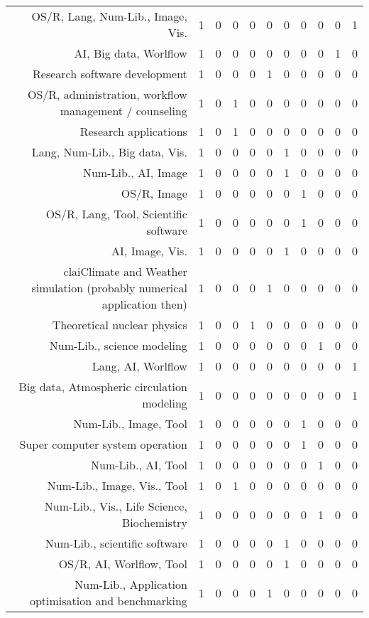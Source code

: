 {\begin{landscape}
\begin{longtable}[htb]{r|c|c|c|c|c|c|c|c|c|c}
{OS/R, Lang, Num-Lib., Image, Vis.} & 1 & 0 & 0 & 0 & 0 & 0 & 0 & 0 & 0 & 1 \\%
{AI, Big data, Worlflow} & 1 & 0 & 0 & 0 & 0 & 0 & 0 & 0 & 1 & 0 \\%
{Research software development} & 1 & 0 & 0 & 0 & 1 & 0 & 0 & 0 & 0 & 0 \\%
{OS/R, administration, workflow management / counseling} & 1 & 0 & 1 & 0 & 0 & 0 & 0 & 0 & 0 & 0 \\%
{Research applications} & 1 & 0 & 1 & 0 & 0 & 0 & 0 & 0 & 0 & 0 \\%
{Lang, Num-Lib., Big data, Vis.} & 1 & 0 & 0 & 0 & 0 & 1 & 0 & 0 & 0 & 0 \\%
{Num-Lib., AI, Image} & 1 & 0 & 0 & 0 & 0 & 1 & 0 & 0 & 0 & 0 \\%
{OS/R, Image} & 1 & 0 & 0 & 0 & 0 & 0 & 1 & 0 & 0 & 0 \\%
{OS/R, Lang, Tool, Scientific software} & 1 & 0 & 0 & 0 & 0 & 0 & 1 & 0 & 0 & 0 \\%
{AI, Image, Vis.} & 1 & 0 & 0 & 0 & 0 & 1 & 0 & 0 & 0 & 0 \\%
{claiClimate and Weather simulation (probably numerical application then)} & 1 & 0 & 0 & 0 & 1 & 0 & 0 & 0 & 0 & 0 \\%
{Theoretical nuclear physics} & 1 & 0 & 0 & 1 & 0 & 0 & 0 & 0 & 0 & 0 \\%
{Num-Lib., science modeling} & 1 & 0 & 0 & 0 & 0 & 0 & 0 & 1 & 0 & 0 \\%
{Lang, AI, Worlflow} & 1 & 0 & 0 & 0 & 0 & 0 & 0 & 0 & 0 & 1 \\%
{Big data, Atmospheric circulation modeling} & 1 & 0 & 0 & 0 & 0 & 0 & 0 & 0 & 0 & 1 \\%
{Num-Lib., Image, Tool} & 1 & 0 & 0 & 0 & 0 & 0 & 1 & 0 & 0 & 0 \\%
{Super computer system operation} & 1 & 0 & 0 & 0 & 0 & 0 & 1 & 0 & 0 & 0 \\%
{Num-Lib., AI, Tool} & 1 & 0 & 0 & 0 & 0 & 0 & 0 & 1 & 0 & 0 \\%
{Num-Lib., Image, Vis., Tool} & 1 & 0 & 1 & 0 & 0 & 0 & 0 & 0 & 0 & 0 \\%
{Num-Lib., Vis., Life Science, Biochemistry} & 1 & 0 & 0 & 0 & 0 & 0 & 0 & 1 & 0 & 0 \\%
{Num-Lib., scientific software} & 1 & 0 & 0 & 0 & 0 & 1 & 0 & 0 & 0 & 0 \\%
{OS/R, AI, Worlflow, Tool} & 1 & 0 & 0 & 0 & 0 & 1 & 0 & 0 & 0 & 0 \\%
{Num-Lib., Application optimisation and benchmarking} & 1 & 0 & 0 & 0 & 1 & 0 & 0 & 0 & 0 & 0 \\%

\end{longtable}
\end{landscape}}
